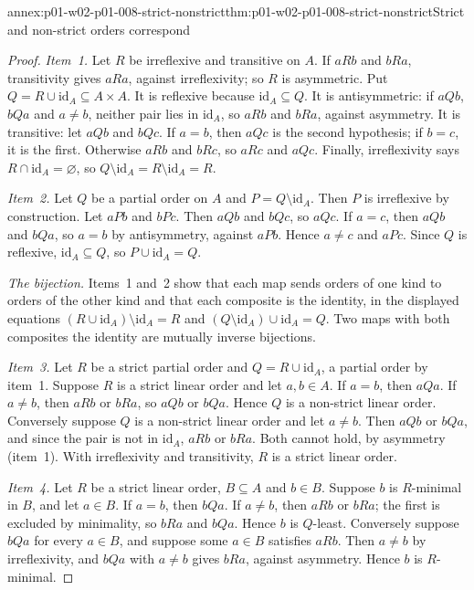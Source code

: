 \begin{annexitem}{annex:p01-w02-p01-008-strict-nonstrict}{thm:p01-w02-p01-008-strict-nonstrict}{Strict and non-strict orders correspond}
\begin{proof}
\emph{Item~1.} Let \(R\) be irreflexive and transitive on \(A\). If \(aRb\)
and \(bRa\), transitivity gives \(aRa\), against irreflexivity; so \(R\) is
asymmetric. Put \(Q=R\cup\mathrm{id}_A\subseteq A\times A\). It is reflexive
because \(\mathrm{id}_A\subseteq Q\). It is antisymmetric: if \(aQb\),
\(bQa\) and \(a\neq b\), neither pair lies in \(\mathrm{id}_A\), so \(aRb\)
and \(bRa\), against asymmetry. It is transitive: let \(aQb\) and \(bQc\).
If \(a=b\), then \(aQc\) is the second hypothesis; if \(b=c\), it is the
first. Otherwise \(aRb\) and \(bRc\), so \(aRc\) and \(aQc\). Finally,
irreflexivity says \(R\cap\mathrm{id}_A=\varnothing\), so
\(Q\setminus\mathrm{id}_A=R\setminus\mathrm{id}_A=R\).

\emph{Item~2.} Let \(Q\) be a partial order on \(A\) and
\(P=Q\setminus\mathrm{id}_A\). Then \(P\) is irreflexive by construction.
Let \(aPb\) and \(bPc\). Then \(aQb\) and \(bQc\), so \(aQc\). If \(a=c\),
then \(aQb\) and \(bQa\), so \(a=b\) by antisymmetry, against \(aPb\).
Hence \(a\neq c\) and \(aPc\). Since \(Q\) is reflexive,
\(\mathrm{id}_A\subseteq Q\), so \(P\cup\mathrm{id}_A=Q\).

\emph{The bijection.} Items~1 and~2 show that each map sends orders of one
kind to orders of the other kind and that each composite is the identity, in
the displayed equations \((R\cup\mathrm{id}_A)\setminus\mathrm{id}_A=R\) and
\((Q\setminus\mathrm{id}_A)\cup\mathrm{id}_A=Q\). Two maps with both
composites the identity are mutually inverse bijections.

\emph{Item~3.} Let \(R\) be a strict partial order and
\(Q=R\cup\mathrm{id}_A\), a partial order by item~1. Suppose \(R\) is a
strict linear order and let \(a,b\in A\). If \(a=b\), then \(aQa\). If
\(a\neq b\), then \(aRb\) or \(bRa\), so \(aQb\) or \(bQa\). Hence \(Q\) is
a non-strict linear order. Conversely suppose \(Q\) is a non-strict linear
order and let \(a\neq b\). Then \(aQb\) or \(bQa\), and since the pair is
not in \(\mathrm{id}_A\), \(aRb\) or \(bRa\). Both cannot hold, by
asymmetry (item~1). With irreflexivity and transitivity, \(R\) is a strict
linear order.

\emph{Item~4.} Let \(R\) be a strict linear order, \(B\subseteq A\) and
\(b\in B\). Suppose \(b\) is \(R\)-minimal in \(B\), and let \(a\in B\). If
\(a=b\), then \(bQa\). If \(a\neq b\), then \(aRb\) or \(bRa\); the first is
excluded by minimality, so \(bRa\) and \(bQa\). Hence \(b\) is \(Q\)-least.
Conversely suppose \(bQa\) for every \(a\in B\), and suppose some \(a\in B\)
satisfies \(aRb\). Then \(a\neq b\) by irreflexivity, and \(bQa\) with
\(a\neq b\) gives \(bRa\), against asymmetry. Hence \(b\) is \(R\)-minimal.


\end{proof}
\end{annexitem}
